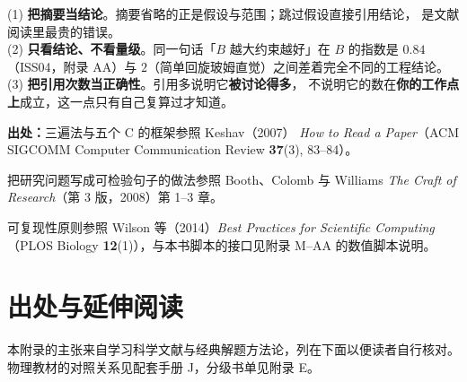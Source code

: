 (1) \textbf{把摘要当结论}。摘要省略的正是假设与范围；跳过假设直接引用结论，
是文献阅读里最贵的错误。\\
(2) \textbf{只看结论、不看量级}。同一句话「$B$ 越大约束越好」在 $B$ 的指数是 $0.84$
（ISS04，附录 AA）与 $2$（简单回旋玻姆直觉）之间差着完全不同的工程结论。\\
(3) \textbf{把引用次数当正确性}。引用多说明它\textbf{被讨论得多}，
不说明它的数在\textbf{你的工作点上}成立，这一点只有自己复算过才知道。

{\footnotesize
\textbf{出处：}三遍法与五个 C 的框架参照 Keshav（2007）
\emph{How to Read a Paper}（ACM SIGCOMM Computer Communication Review \textbf{37}(3), 83--84）。

把研究问题写成可检验句子的做法参照 Booth、Colomb 与 Williams
\emph{The Craft of Research}（第 3 版，2008）第 1--3 章。

可复现性原则参照 Wilson 等（2014）\emph{Best Practices for Scientific Computing}
（PLOS Biology \textbf{12}(1)），与本书脚本的接口见附录 M--AA 的数值脚本说明。
}

\section{出处与延伸阅读}
\label{sec:app-i-refs}

本附录的主张来自学习科学文献与经典解题方法论，列在下面以便读者自行核对。物理教材的对照关系见配套手册 J，分级书单见附录 E。

